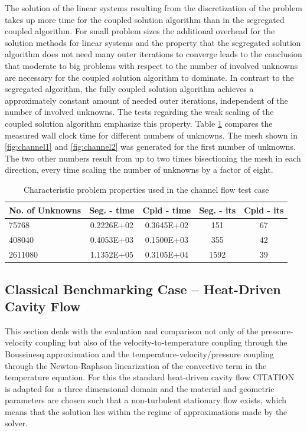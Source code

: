 The solution of the linear systems resulting from the discretization of the problem takes up more time for the coupled solution algorithm than in the segregated coupled algorithm. For small problem sizes the additional overhead for the solution methods for linear systems and the property that the segregated solution algorithm does not need many outer iterations to converge leads to the conclusion that moderate to big problems with respect to the number of involved unknowns are necessary for the coupled solution algorithm to dominate. In contrast to the segregated algorithm, the fully coupled solution algorithm achieves a approximately constant amount of needed outer iterations, independent of the number of involved unknowns. The tests regarding the weak scaling of the coupled solution algorithm emphasize this property. Table \ref{tab:channelcompare} compares the measured wall clock time for different numbers of unknowns. The mesh shown in \ref{fig:channel1} and \ref{fig:channel2} was generated for the first number of unknowns. The two other numbers result from up to two times bisectioning the mesh in each direction, every time scaling the number of unknowns by a factor of eight.
\begin{table}[h!]\centering
{}
  \begin{tabular}{lcccc}\toprule
    No. of Unknowns & Seg. - time & Cpld - time & Seg. - its & Cpld - its \\
    \midrule
    \rowcolor{black!20} 75768    & 0.2226E+02 & 0.3645E+02 & 151  & 67 \\
    \rowcolor{black!00} 408040   & 0.4053E+03 & 0.1500E+03 & 355  & 42 \\
    \rowcolor{black!20} 2611080  & 1.1352E+05 & 0.3105E+04 & 1592 & 39 \\
  \end{tabular}
  \caption{Characteristic problem properties used in the channel flow test case}
  \label{tab:channelcompare}
\end{table}

\subsection{Classical Benchmarking Case -- Heat-Driven Cavity Flow}

This section deals with the evaluation and comparison not only of the pressure-velocity coupling but also of the velocity-to-temperature coupling through the Boussinesq approximation and the temperature-velocity/pressure coupling through the Newton-Raphson linearization of the convective term in the temperature equation. For this the standard heat-driven cavity flow CITATION is adapted for a three dimensional domain and the material and geometric parameters are chosen such that a non-turbulent stationary flow exists, which means that the solution lies within the regime of approximations made by the solver.

